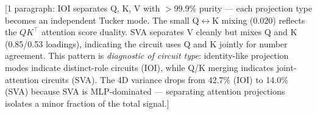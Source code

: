 \documentclass[11pt]{article}
\begin{document}
[1 paragraph: IOI separates Q, K, V with $>$99.9\% purity --- each
projection type becomes an independent Tucker mode. The small Q$\leftrightarrow$K
mixing (0.020) reflects the $QK^\top$ attention score duality. SVA
separates V cleanly but mixes Q and K (0.85/0.53 loadings), indicating
the circuit uses Q and K jointly for number agreement. This pattern is
\emph{diagnostic of circuit type}: identity-like projection modes indicate
distinct-role circuits (IOI), while Q/K merging indicates joint-attention
circuits (SVA). The 4D variance drops from 42.7\% (IOI) to 14.0\% (SVA)
because SVA is MLP-dominated --- separating attention projections isolates
a minor fraction of the total signal.]


%
%
%
%
\end{document}
